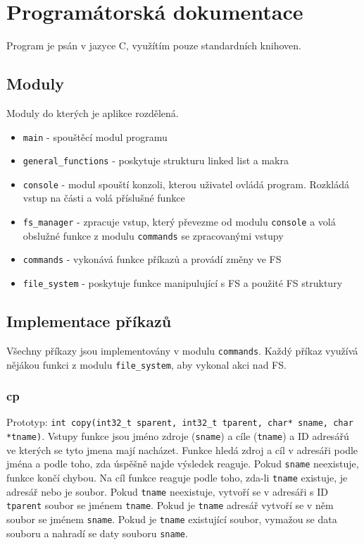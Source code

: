 \documentclass[12pt]{report}
\begin{document}
\chapter{Programátorská dokumentace}
Program je psán v jazyce C, využítím pouze standardních knihoven.
%
\section{Moduly}
Moduly do kterých je aplikce rozdělená.
\begin{itemize}
	\item \texttt{main} - spouštěcí modul programu
	\item \texttt{general\_functions} - poskytuje strukturu linked list a makra
	\item \texttt{console} - modul spouští konzoli, kterou uživatel ovládá program.
		Rozkládá vstup na části a volá příslušné funkce
	\item \texttt{fs\_manager} - zpracuje vstup, který převezme od modulu \texttt{console} a volá
		obslužné funkce z modulu \texttt{commands} se zpracovanými vstupy
	\item \texttt{commands} - vykonává funkce příkazů a provádí změny ve FS
	\item \texttt{file\_system} - poskytuje funkce manipulující s FS a použité FS struktury
\end{itemize}
%
\section{Implementace příkazů}
Všechny příkazy jsou implementovány v modulu \texttt{commands}. Každý příkaz využívá nějákou funkci z
modulu \texttt{file\_system}, aby vykonal akci nad FS.
\subsection{cp}
Prototyp: \texttt{int copy(int32\_t sparent, int32\_t tparent, char* sname, char *tname)}. Vstupy funkce
jsou jméno zdroje (\texttt{sname}) a cíle (\texttt{tname}) a ID adresářú ve kterých se tyto jmena mají nacházet. Funkce 
hledá zdroj a cíl v adresáři podle jména a podle toho, zda úspěšně najde výsledek reaguje. Pokud \texttt{sname}
neexistuje, funkce končí chybou. Na cíl funkce reaguje podle toho, zda-li \texttt{tname} existuje, je adresář nebo
je soubor. Pokud \texttt{tname} neexistuje, vytvoří se v adresáři s ID \texttt{tparent} soubor se jménem \texttt{tname}.
Pokud je \texttt{tname} adresář vytvoří se v něm soubor se jménem \texttt{sname}. Pokud je \texttt{tname}
existující soubor, vymažou se data souboru a nahradí se daty souboru \texttt{sname}.
\end{document}
